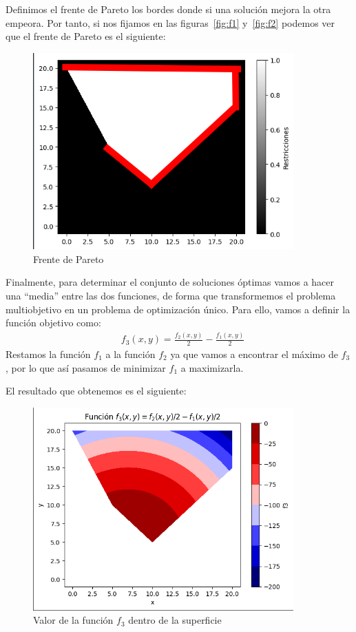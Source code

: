 \documentclass[12pt, letterpaper]{article}
\begin{document}
\newpage
Definimos el frente de Pareto los bordes donde si una solución mejora la otra empeora. Por tanto, si nos fijamos en las figuras~\ref{fig:f1} y~\ref{fig:f2} podemos ver que el frente de Pareto es el siguiente:

\begin{figure}[h]
    \centering
    \includegraphics[width=10cm]{images/pareto.png}
    \caption{Frente de Pareto\label{fig:pareto}}
\end{figure}

Finalmente, para determinar el conjunto de soluciones óptimas vamos a hacer una ``media'' entre las dos funciones, de forma que transformemos el problema multiobjetivo en un problema de optimización único. Para ello, vamos a definir la función objetivo como:
\begin{align*}
    & f_3(x,y) = \frac{f_2(x,y)}{2} - \frac{f_1(x,y)}{2}
\end{align*}
Restamos la función $f_1$ a la función $f_2$ ya que vamos a encontrar el máximo de $f_3$, por lo que así pasamos de minimizar $f_1$ a maximizarla.

\newpage
El resultado que obtenemos es el siguiente:
\begin{figure}[h]
    \centering
    \includegraphics[width=10cm]{images/f3.png}
    \caption{Valor de la función $f_3$ dentro de la superficie\label{fig:f3}}
\end{figure}
\end{document}
